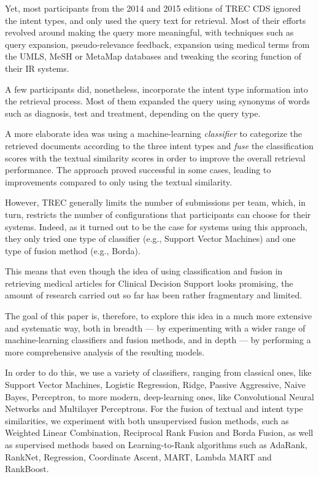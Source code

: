 Yet, most participants from the 2014 and 2015 editions of TREC CDS ignored the intent types,
and only used the query text for retrieval. 
Most of their efforts revolved around making the query more meaningful, with techniques
such as query expansion, pseudo-relevance feedback, expansion using medical terms from the UMLS, MeSH or MetaMap databases and tweaking
the scoring function of their IR systems.

A few participants did, nonetheless, incorporate the intent type information into the retrieval process. Most of them
 expanded the query using synonyms of words such as diagnosis, test and treatment, depending on the query type.

A more elaborate idea was using a machine-learning \emph{classifier} to categorize the retrieved documents according
to the three intent types and \emph{fuse} the classification scores
with the textual similarity scores in order to improve the overall retrieval performance.
The approach proved successful in some cases, leading to improvements compared to only using the textual similarity.

However, TREC generally limits the number of submissions per team, which, in turn, restricts
the number of configurations that participants can choose for their systems. 
Indeed, as it turned out to be the case for systems using this approach,
they only tried one type of classifier (e.g., Support Vector Machines)
and one type of fusion method (e.g., Borda).

This means that even though the idea of using classification and fusion 
in retrieving medical articles for Clinical Decision Support looks promising, 
the amount of research carried out so far has been rather fragmentary and limited.

The goal of this paper is, therefore, to
explore this idea in a much more extensive and systematic way, both in breadth --- by experimenting
with a wider range of machine-learning classifiers and fusion methods,
and in depth --- by performing a more comprehensive analysis of the resulting models.

In order to do this, we use a variety of classifiers, ranging from classical ones, like Support Vector Machines,
Logistic Regression, Ridge, Passive Aggressive, Naive Bayes, Perceptron,
to more modern, deep-learning ones, like Convolutional Neural Networks and Multilayer Perceptrons.
For the fusion of textual and intent type similarities,
we experiment with both unsupervised fusion methods, such as Weighted Linear Combination, Reciprocal Rank Fusion and Borda Fusion,
as well as supervised methods based
on Learning-to-Rank algorithms such as AdaRank, RankNet, Regression, Coordinate Ascent, MART, Lambda MART and RankBoost.

